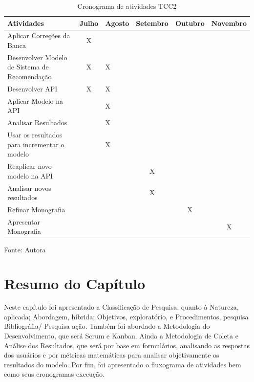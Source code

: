 \begin{table}[htbp]
    \centering
    \begin{threeparttable}
        \caption{Cronograma de atividades TCC2}
        \label{tab:4}
        \begin{tabular}{>{\raggedright\arraybackslash}m{6cm} c m{1cm} c c c}
        \toprule 
        Atividades & Julho & Agosto & Setembro & Outubro & Novembro \\
        \midrule
        Aplicar Correções da Banca & X &  &  &  & \\
        \hline 
        Desenvolver Modelo de Sistema de Recomendação & X & X &  &  & \\
        \hline 
        Desenvolver API & X & X &  &  & \\
        \hline 
        Aplicar Modelo na API &  & X &  &  & \\
        \hline 
        Analisar Resultados &  & X & &  & \\
        \hline 
        Usar os resultados para incrementar o modelo &  & X & &  & \\
        \hline 
        Reaplicar novo modelo na API &  &  & X &  & \\
        \hline 
        Analisar novos resultados &  &  & X &  & \\
        \hline 
        Refinar Monografia &  &  &  & X & \\
        \hline
        Apresentar Monografia &  &  &  & & X \\
        \bottomrule 
        \end{tabular}
        \begin{tablenotes}
            \small
            \centering
            \item Fonte: Autora
        \end{tablenotes}
    \end{threeparttable}
\end{table}

\section{Resumo do Capítulo}\label{sec:resmet}
Neste capítulo foi apresentado a Classificação de Pesquisa, quanto à Natureza, aplicada; Abordagem, híbrida; Objetivos, 
exploratório, e Procedimentos, pesquisa Bibliográfia/ Pesquisa-ação. Também foi abordado a Metodologia do 
Desenvolvimento, que será Scrum e Kanban. Ainda a Metodologia de Coleta e Análise dos Resultados, que será por base em
formulários, analisando as respostas dos usuários e por métricas matemáticas para analisar objetivamente os resultados
do modelo. Por fim, foi apresentado o fluxograma de atividades 
bem como seus cronogramas execução.